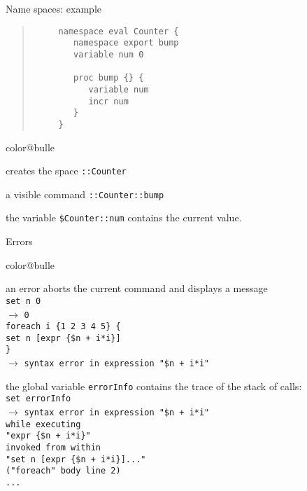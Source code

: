 \documentclass[a4paper,landscape,smooth]{show}
\newcommand{\tclex}[2]{\texttt{#1}\\$\rightarrow$ \texttt{#2}}
\begin{document}
\begin{tslide}{Name spaces: example}
   \vfill
   \begin{quote}
      \begin{verbatim}
	 namespace eval Counter {
	    namespace export bump
	    variable num 0

	    proc bump {} {
	       variable num
	       incr num
	    }
	 }
      \end{verbatim}
   \end{quote}
   \vfill
   \begin{bitemize}{color@bulle}
      \item creates the space \texttt{::Counter}
      \item a visible command \texttt{::Counter::bump}
      \item the variable \texttt{\$Counter::num} contains the current
	 value. 
   \end{bitemize}
   \vfill
\end{tslide}


\begin{tslide}{Errors}
   \vfill
   \begin{bitemize}{color@bulle}
      \item an error aborts the current command and displays a
	 message \\
	 \tclex{set n 0}{0}\\
	 \tclex{foreach i \{1 2 3 4 5\} \{\\
	    set n [expr \{\$n + i*i\}]\\
	 \}}{syntax error in expression "\$n + i*i"}
      \item the global variable \texttt{errorInfo} contains the trace of
	 the stack of calls: \\
      \tclex{set errorInfo}{syntax error in expression "\$n + i*i"\\
	 while executing\\
	 "expr \{\$n + i*i\}"\\
	 invoked from within\\
	 "set n [expr \{\$n + i*i\}]..."\\
	 ("foreach" body line 2)\\
	 ...}
   \end{bitemize}
   \vfill
\end{tslide}

\end{document}
